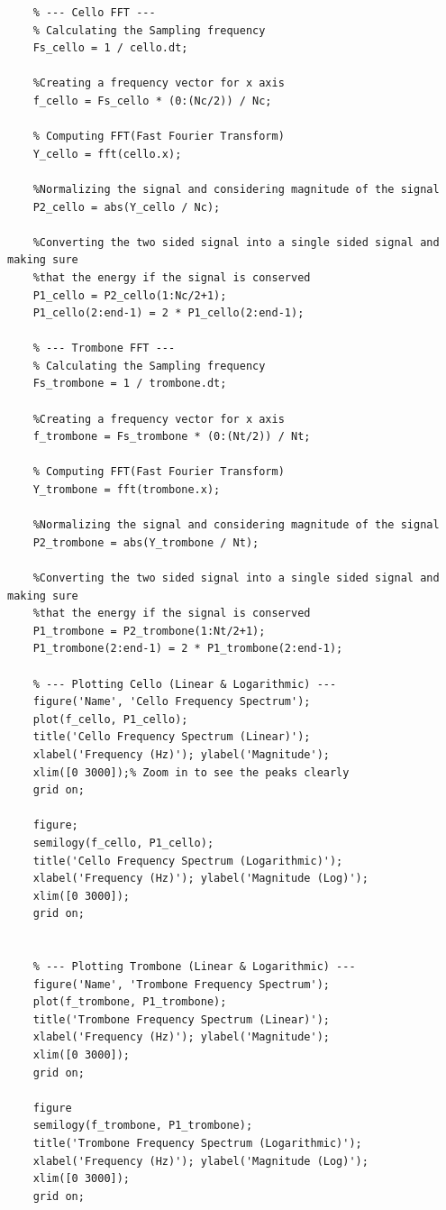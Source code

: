 \documentclass[12pt, a4paper]{article}
\begin{document}
\begin{lstlisting}
    % --- Cello FFT ---
    % Calculating the Sampling frequency
    Fs_cello = 1 / cello.dt;       
    
    %Creating a frequency vector for x axis 
    f_cello = Fs_cello * (0:(Nc/2)) / Nc;
    
    % Computing FFT(Fast Fourier Transform)
    Y_cello = fft(cello.x);               
    
    %Normalizing the signal and considering magnitude of the signal
    P2_cello = abs(Y_cello / Nc);           
    
    %Converting the two sided signal into a single sided signal and making sure
    %that the energy if the signal is conserved
    P1_cello = P2_cello(1:Nc/2+1);          
    P1_cello(2:end-1) = 2 * P1_cello(2:end-1); 
    
    % --- Trombone FFT ---
    % Calculating the Sampling frequency
    Fs_trombone = 1 / trombone.dt;     
    
    %Creating a frequency vector for x axis 
    f_trombone = Fs_trombone * (0:(Nt/2)) / Nt; 
    
    % Computing FFT(Fast Fourier Transform)
    Y_trombone = fft(trombone.x);    
    
    %Normalizing the signal and considering magnitude of the signal
    P2_trombone = abs(Y_trombone / Nt); 
    
    %Converting the two sided signal into a single sided signal and making sure
    %that the energy if the signal is conserved
    P1_trombone = P2_trombone(1:Nt/2+1); 
    P1_trombone(2:end-1) = 2 * P1_trombone(2:end-1);
    
    % --- Plotting Cello (Linear & Logarithmic) ---
    figure('Name', 'Cello Frequency Spectrum');
    plot(f_cello, P1_cello);
    title('Cello Frequency Spectrum (Linear)');
    xlabel('Frequency (Hz)'); ylabel('Magnitude');
    xlim([0 3000]);% Zoom in to see the peaks clearly
    grid on;
    
    figure;
    semilogy(f_cello, P1_cello);
    title('Cello Frequency Spectrum (Logarithmic)');
    xlabel('Frequency (Hz)'); ylabel('Magnitude (Log)');
    xlim([0 3000]);
    grid on;
    
    
    % --- Plotting Trombone (Linear & Logarithmic) ---
    figure('Name', 'Trombone Frequency Spectrum');
    plot(f_trombone, P1_trombone);
    title('Trombone Frequency Spectrum (Linear)');
    xlabel('Frequency (Hz)'); ylabel('Magnitude');
    xlim([0 3000]);
    grid on;
    
    figure
    semilogy(f_trombone, P1_trombone);
    title('Trombone Frequency Spectrum (Logarithmic)');
    xlabel('Frequency (Hz)'); ylabel('Magnitude (Log)');
    xlim([0 3000]);
    grid on;
    \end{lstlisting}
\newpage
\end{document}
